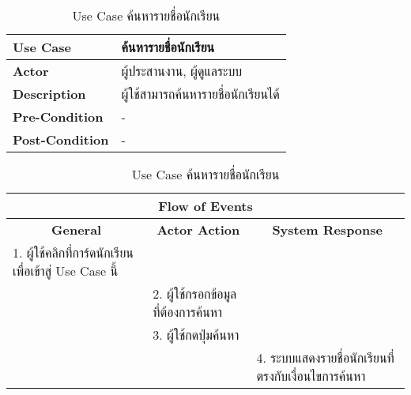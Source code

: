 \begin{table}[H]
    \caption{Use Case ค้นหารายชื่อนักเรียน}
    \label{tab:usecase-search-student}
    \begin{tabularx}{\textwidth}{ | p{3cm} | X | }
    \hline
    \textbf{Use Case} & ค้นหารายชื่อนักเรียน \\
    \hline
    \textbf{Actor} & ผู้ประสานงาน, ผู้ดูแลระบบ \\
    \hline
    \textbf{Description} & ผู้ใช้สามารถค้นหารายชื่อนักเรียนได้ \\
    \hline
    \textbf{Pre-Condition} & - \\
    \hline
    \textbf{Post-Condition} & - \\
    \hline
    \end{tabularx}
    \begin{tabularx}{\textwidth}{ | X | X | X | }
    \multicolumn{3}{|c|}{\textbf{Flow of Events}} \\
    \hline
    \multicolumn{1}{|c|}{\textbf{General}} & \multicolumn{1}{|c|}{\textbf{Actor Action}} & \multicolumn{1}{|c|}{\textbf{System Response}} \\
    \hline
    1. ผู้ใช้คลิกที่การ์ดนักเรียนเพื่อเข้าสู่ Use Case นี้ &  &  \\
    \hline
    & 2. ผู้ใช้กรอกข้อมูลที่ต้องการค้นหา & \\
    \hline
    & 3. ผู้ใช้กดปุ่มค้นหา &  \\
    \hline
    & & 4. ระบบแสดงรายชื่อนักเรียนที่ตรงกับเงื่อนไขการค้นหา \\
    \hline
    \end{tabularx}
\end{table}
